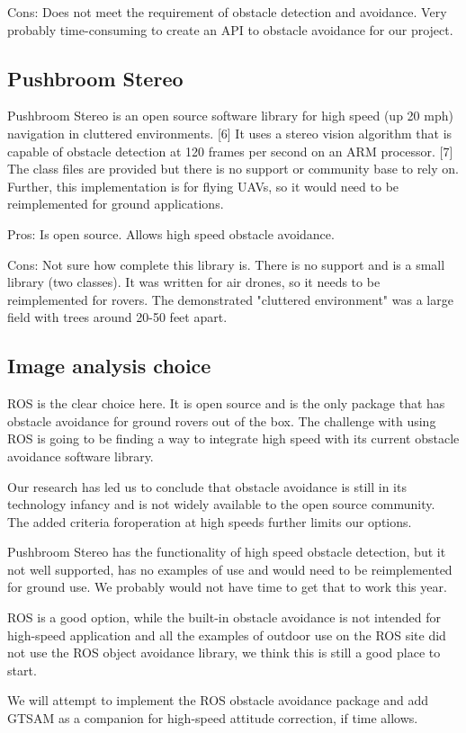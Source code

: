 \documentclass[compsoc,draftclsnofoot,onecolumn,10pt]{IEEEtran}
\begin{document}
Cons: Does not meet the requirement of obstacle detection and avoidance.
Very probably time-consuming to create an API to obstacle avoidance for our project.

\subsection{Pushbroom Stereo}
Pushbroom Stereo is an open source software library for high speed (up 20 mph) navigation in
cluttered environments. [6] It uses a stereo vision algorithm that is capable of
obstacle detection at 120 frames per second on an ARM processor. [7] The class
files are provided but there is no support or community base to rely on.
Further, this implementation is for flying UAVs, so it would need to be
reimplemented for ground applications.

Pros: Is open source. Allows high speed obstacle avoidance.

Cons: Not sure how complete this library is. There is no support and is a small 
library (two classes). It was written for air drones, so it needs to be reimplemented for
rovers. The demonstrated "cluttered environment" was a large field with trees around
20-50 feet apart.

\subsection{Image analysis choice}
ROS is the clear choice here. It is open source and is the only package that has
obstacle avoidance for ground rovers out of the box. The challenge with using ROS
is going to be finding a way to integrate high speed with its current obstacle
avoidance software library.\par
Our research has led us to conclude that obstacle avoidance is still in its
technology infancy and is not widely available to the open source community. The
added criteria foroperation at high speeds further limits our options.\par
Pushbroom Stereo has the functionality of high speed obstacle detection, but it
not well supported, has no examples of use and would need to be reimplemented
for ground use. We probably would not have time to get that to work this
year.\par
ROS is a good option, while the built-in obstacle avoidance is not intended for
high-speed application and all the examples of outdoor use on the ROS site did not
use the ROS object avoidance library, we think this is still a good place to start.\par
We will attempt to implement the ROS obstacle avoidance package and add GTSAM as a
companion for high-speed attitude correction, if time allows.
\end{document}
